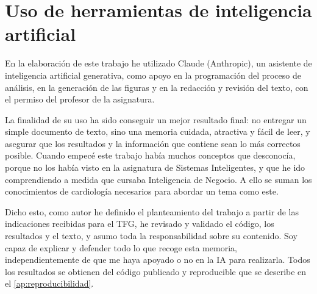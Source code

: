 \clearpage
\section{Uso de herramientas de inteligencia artificial}\label{ap:ia}

En la elaboración de este trabajo he utilizado Claude (Anthropic), un asistente de inteligencia artificial generativa, como apoyo en la programación del proceso de análisis, en la generación de las figuras y en la redacción y revisión del texto, con el permiso del profesor de la asignatura.

La finalidad de su uso ha sido conseguir un mejor resultado final: no entregar un simple documento de texto, sino una memoria cuidada, atractiva y fácil de leer, y asegurar que los resultados y la información que contiene sean lo más correctos posible. Cuando empecé este trabajo había muchos conceptos que desconocía, porque no los había visto en la asignatura de Sistemas Inteligentes, y que he ido comprendiendo a medida que cursaba Inteligencia de Negocio. A ello se suman los conocimientos de cardiología necesarios para abordar un tema como este.

Dicho esto, como autor he definido el planteamiento del trabajo a partir de las indicaciones recibidas para el TFG, he revisado y validado el código, los resultados y el texto, y asumo toda la responsabilidad sobre su contenido. Soy capaz de explicar y defender todo lo que recoge esta memoria, independientemente de que me haya apoyado o no en la IA para realizarla. Todos los resultados se obtienen del código publicado y reproducible que se describe en el \cref{ap:reproducibilidad}.

